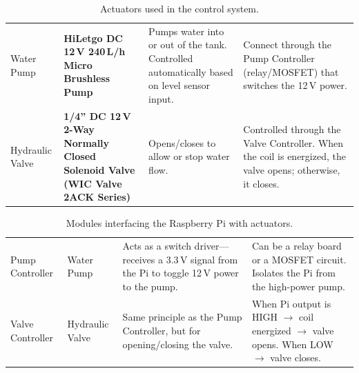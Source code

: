  
\begin{table}[p]
  \centering
  \footnotesize
  \renewcommand{\arraystretch}{1.4}
  \setlength{\tabcolsep}{5pt}
  \caption{Actuators used in the control system.}
  \label{tab:actuators}
  \begin{tabular}{|P{1.8cm}|P{3.2cm}|P{5.2cm}|P{5.8cm}|}
    \hline
      & 
      & 
      &  \\
    \hline
    Water Pump
      & \textbf{HiLetgo DC 12\,V 240\,L/h Micro Brushless Pump}
      & Pumps water into or out of the tank.
        Controlled automatically based on level sensor input.
      & Connect through the Pump Controller (relay/MOSFET)
        that switches the 12\,V power. \\
    \hline
    Hydraulic Valve
      & \textbf{1/4'' DC 12\,V 2-Way Normally Closed Solenoid
               Valve (WIC Valve 2ACK Series)}
      & Opens/closes to allow or stop water flow.
      & Controlled through the Valve Controller.
        When the coil is energized, the valve opens;
        otherwise, it closes. \\
    \hline
  \end{tabular}
\end{table}
 
 
\begin{table}[p]
  \centering
  \footnotesize
  \renewcommand{\arraystretch}{1.4}
  \setlength{\tabcolsep}{5pt}
  \caption{Modules interfacing the Raspberry Pi with actuators.}
  \label{tab:controllers}
  \begin{tabular}{|P{2cm}|P{2.2cm}|P{5.8cm}|P{5.8cm}|}
    \hline
      & 
      & 
      &  \\
    \hline
    Pump Controller
      & Water Pump
      & Acts as a switch driver---receives a 3.3\,V signal from
        the Pi to toggle 12\,V power to the pump.
      & Can be a relay board or a MOSFET circuit.
        Isolates the Pi from the high-power pump. \\
    \hline
    Valve Controller
      & Hydraulic Valve
      & Same principle as the Pump Controller, but for
        opening/closing the valve.
      & When Pi output is HIGH $\rightarrow$ coil energized
        $\rightarrow$ valve opens.
        When LOW $\rightarrow$ valve closes. \\
    \hline
  \end{tabular}
\end{table}
 
